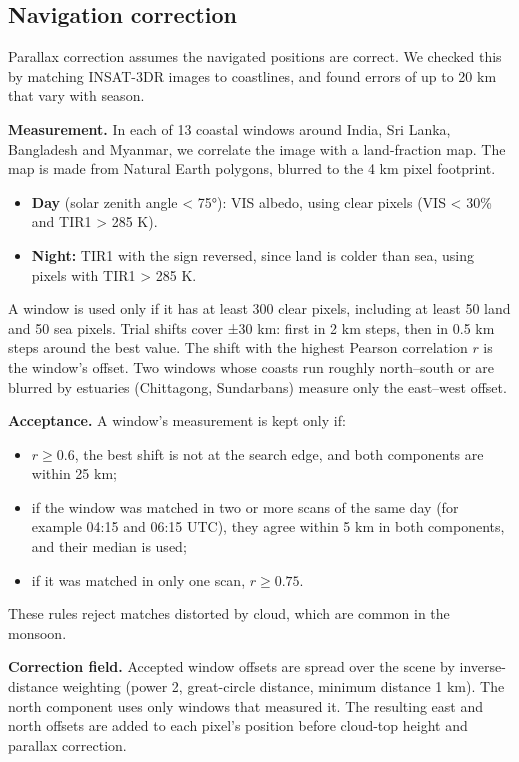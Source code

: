 \subsection{Navigation correction}\label{sec:3.6}

Parallax correction assumes the navigated positions are correct. We checked this by matching INSAT-3DR images to coastlines, and found errors of up to 20 km that vary with season.

\textbf{Measurement.} In each of 13 coastal windows around India, Sri Lanka, Bangladesh and Myanmar, we correlate the image with a land-fraction map. The map is made from Natural Earth polygons, blurred to the 4 km pixel footprint.

\begin{itemize}
\tightlist
\item
  \textbf{Day} (solar zenith angle \textless{} 75°): VIS albedo, using clear pixels (VIS \textless{} 30\% and TIR1 \textgreater{} 285 K).
\item
  \textbf{Night:} TIR1 with the sign reversed, since land is colder than sea, using pixels with TIR1 \textgreater{} 285 K.
\end{itemize}

A window is used only if it has at least 300 clear pixels, including at least 50 land and 50 sea pixels. Trial shifts cover ±30 km: first in 2 km steps, then in 0.5 km steps around the best value. The shift with the highest Pearson correlation \(r\) is the window's offset. Two windows whose coasts run roughly north--south or are blurred by estuaries (Chittagong, Sundarbans) measure only the east--west offset.

\textbf{Acceptance.} A window's measurement is kept only if:

\begin{itemize}
\tightlist
\item
  \(r \ge 0.6\), the best shift is not at the search edge, and both components are within 25 km;
\item
  if the window was matched in two or more scans of the same day (for example 04:15 and 06:15 UTC), they agree within 5 km in both components, and their median is used;
\item
  if it was matched in only one scan, \(r \ge 0.75\).
\end{itemize}

These rules reject matches distorted by cloud, which are common in the monsoon.

\textbf{Correction field.} Accepted window offsets are spread over the scene by inverse-distance weighting (power 2, great-circle distance, minimum distance 1 km). The north component uses only windows that measured it. The resulting east and north offsets are added to each pixel's position before cloud-top height and parallax correction.

